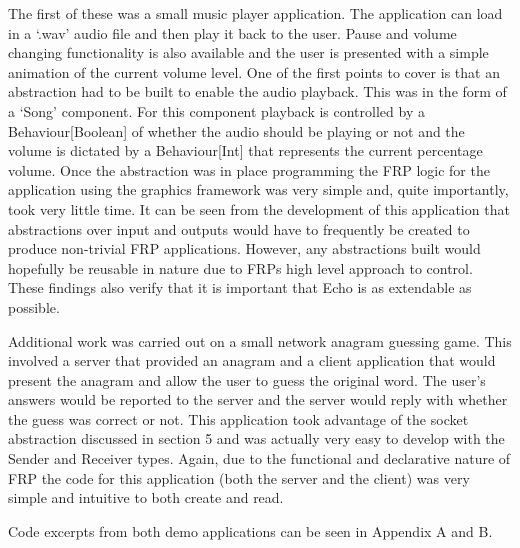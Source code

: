     The first of these was a small music player application. The application
    can load in a `.wav' audio file and then play it back to the user. Pause and volume changing functionality
    is also available and the user is presented with a simple animation of the current volume level. One of the
    first points to cover is that an abstraction had to be built to enable the audio playback. This was in the form
    of a `Song' component. For this component playback is controlled by a Behaviour[Boolean] of whether the audio
    should be playing or not and the volume is dictated by a Behaviour[Int] that represents the current percentage
    volume. Once the abstraction was in place programming the FRP logic for the application using the 
    graphics framework was very simple and, quite importantly, took very little time. It can be seen from
    the development of this application that abstractions over input and outputs would have to frequently be
    created to produce non-trivial FRP applications. However, any abstractions built would hopefully be
    reusable in nature due to FRPs high level approach to control. These findings also verify that it
    is important that Echo is as extendable as possible.
    
    Additional work was carried out on a small network anagram guessing game. This involved a server that provided
    an anagram and a client application that would present the anagram and allow the user to guess the original
    word. The user's answers would be reported to the server and the server would reply with whether
    the guess was correct or not. This application took advantage of the socket abstraction discussed in section 5
    and was actually very easy to develop with the Sender and Receiver types. Again, due to the functional and
    declarative nature of FRP the code for this application (both the server and the client) was very simple
    and intuitive to both create and read.
    
    Code excerpts from both demo applications can be seen in Appendix A and B. 